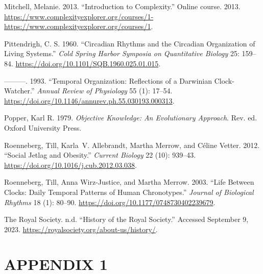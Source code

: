 \documentclass[
  12pt,
  a4paper,
  oneside]{tesesusp}
\newlength{\cslhangindent}
\newlength{\cslentryspacingunit} %
\newenvironment{CSLReferences}[2] %
 {%
  \setlength{\parindent}{0pt}
  \ifodd #1
  \let\oldpar\par
  \def\par{\hangindent=\cslhangindent\oldpar}
  \fi
  \setlength{\parskip}{#2\cslentryspacingunit}
 }%
 {}
\begin{document}
\begin{CSLReferences}{1}{0}
\leavevmode{}%
Mitchell, Melanie. 2013. {``Introduction to Complexity.''} Online
course. 2013.
\url{https://www.complexityexplorer.org/courses/1-https://www.complexityexplorer.org/courses/1}.

\leavevmode{}%
Pittendrigh, C. S. 1960. {``Circadian Rhythms and the Circadian
Organization of Living Systems.''} \emph{Cold Spring Harbor Symposia on
Quantitative Biology} 25: 159--84.
\url{https://doi.org/10.1101/SQB.1960.025.01.015}.

\leavevmode{}%
---------. 1993. {``Temporal Organization: Reflections of a Darwinian
Clock-Watcher.''} \emph{Annual Review of Physiology} 55 (1): 17--54.
\url{https://doi.org/10.1146/annurev.ph.55.030193.000313}.

\leavevmode{}%
Popper, Karl R. 1979. \emph{Objective Knowledge: An Evolutionary
Approach}. Rev. ed. Oxford University Press.

\leavevmode{}%
Roenneberg, Till, Karla~V. Allebrandt, Martha Merrow, and Céline Vetter.
2012. {``Social Jetlag and Obesity.''} \emph{Current Biology} 22 (10):
939--43. \url{https://doi.org/10.1016/j.cub.2012.03.038}.

\leavevmode{}%
Roenneberg, Till, Anna Wirz-Justice, and Martha Merrow. 2003. {``Life
Between Clocks: Daily Temporal Patterns of Human Chronotypes.''}
\emph{Journal of Biological Rhythms} 18 (1): 80--90.
\url{https://doi.org/10.1177/0748730402239679}.

\leavevmode{}%
The Royal Society. n.d. {``History of the Royal Society.''} Accessed
September 9, 2023. \url{https://royalsociety.org/about-us/history/}.

\end{CSLReferences}

\cleardoublepage
{}
{}
\appendix

\hypertarget{appendix-1}{%
\chapter{APPENDIX 1}\label{appendix-1}}
\end{document}
